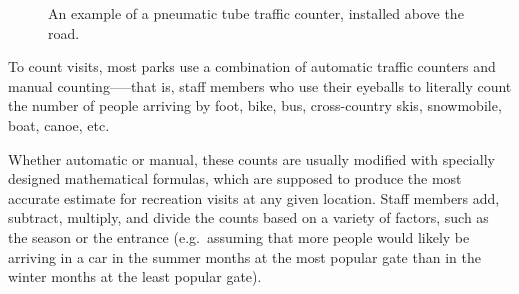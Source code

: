 \documentclass[
  letterpaper,
  DIV=11,
  numbers=noendperiod]{scrartcl}
\begin{document}
\begin{figure}


\caption{\label{fig-pneumatic-tube}An example of a pneumatic tube
traffic counter, installed above the road.}

\end{figure}%

To count visits, most parks use a combination of automatic traffic
counters and manual counting-----that is, staff members who use their
eyeballs to literally count the number of people arriving by foot, bike,
bus, cross-country skis, snowmobile, boat, canoe, etc.

Whether automatic or manual, these counts are usually modified with
specially designed mathematical formulas, which are supposed to produce
the most accurate estimate for recreation visits at any given location.
Staff members add, subtract, multiply, and divide the counts based on a
variety of factors, such as the season or the entrance (e.g.~assuming
that more people would likely be arriving in a car in the summer months
at the most popular gate than in the winter months at the least popular
gate).
\end{document}

